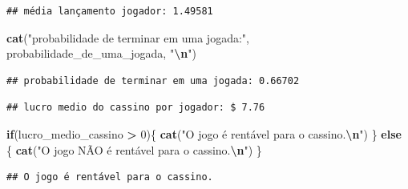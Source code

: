 \documentclass[
]{article}
\newenvironment{Shaded}{\begin{snugshade}}{\end{snugshade}}
\newcommand{\ControlFlowTok}[1]{\textcolor[rgb]{0.13,0.29,0.53}{\textbf{#1}}}
\newcommand{\DecValTok}[1]{\textcolor[rgb]{0.00,0.00,0.81}{#1}}
\newcommand{\FloatTok}[1]{\textcolor[rgb]{0.00,0.00,0.81}{#1}}
\newcommand{\FunctionTok}[1]{\textcolor[rgb]{0.13,0.29,0.53}{\textbf{#1}}}
\newcommand{\NormalTok}[1]{#1}
\newcommand{\OtherTok}[1]{\textcolor[rgb]{0.56,0.35,0.01}{#1}}
\newcommand{\SpecialCharTok}[1]{\textcolor[rgb]{0.81,0.36,0.00}{\textbf{#1}}}
\newcommand{\StringTok}[1]{\textcolor[rgb]{0.31,0.60,0.02}{#1}}
\begin{document}
\begin{verbatim}
## média lançamento jogador: 1.49581
\end{verbatim}

\begin{Shaded}
\begin{Highlighting}[]
\FunctionTok{cat}\NormalTok{(}\StringTok{"probabilidade de terminar em uma jogada:"}\NormalTok{, probabilidade\_de\_uma\_jogada, }\StringTok{"}\SpecialCharTok{\textbackslash{}n}\StringTok{"}\NormalTok{)}
\end{Highlighting}
\end{Shaded}

\begin{verbatim}
## probabilidade de terminar em uma jogada: 0.66702
\end{verbatim}

\begin{Shaded}
\end{Shaded}

\begin{verbatim}
## lucro medio do cassino por jogador: $ 7.76
\end{verbatim}

\begin{Shaded}
\begin{Highlighting}[]
\ControlFlowTok{if}\NormalTok{(lucro\_medio\_cassino }\SpecialCharTok{\textgreater{}} \DecValTok{0}\NormalTok{)\{}
    \FunctionTok{cat}\NormalTok{(}\StringTok{"O jogo é rentável para o cassino.}\SpecialCharTok{\textbackslash{}n}\StringTok{"}\NormalTok{)}
\NormalTok{\} }\ControlFlowTok{else}\NormalTok{ \{}
    \FunctionTok{cat}\NormalTok{(}\StringTok{"O jogo NÃO é rentável para o cassino.}\SpecialCharTok{\textbackslash{}n}\StringTok{"}\NormalTok{)}
\NormalTok{\}}
\end{Highlighting}
\end{Shaded}

\begin{verbatim}
## O jogo é rentável para o cassino.
\end{verbatim}
\end{document}
